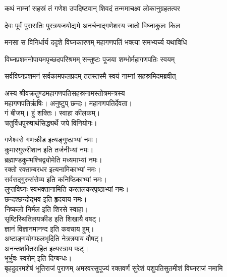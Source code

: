 

\twolineshloka
{कथं नाम्नां सहस्रं तं गणेश उपदिष्टवान्}
{शिवदं तन्ममाचक्ष्व लोकानुग्रहतत्पर}


\twolineshloka
{देवः पूर्वं पुरारातिः पुरत्रयजयोद्यमे}
{अनर्चनाद्गणेशस्य जातो विघ्नाकुलः किल}

\twolineshloka
{मनसा स विनिर्धार्य ददृशे विघ्नकारणम्}
{महागणपतिं भक्त्या समभ्यर्च्य यथाविधि}

\twolineshloka
{विघ्नप्रशमनोपायमपृच्छदपरिश्रमम्}
{सन्तुष्टः पूजया शम्भोर्महागणपतिः स्वयम्}

\twolineshloka
{सर्वविघ्नप्रशमनं सर्वकामफलप्रदम्}
{ततस्तस्मै स्वयं नाम्नां सहस्रमिदमब्रवीत्}

अस्य श्रीवक्रतुण्डमहागणपतिसहस्रनामस्तोत्रमन्त्रस्य\\
महागणपतिर्ऋषिः। अनुष्टुप् छन्दः। महागणपतिर्देवता।\\
गं बीजम्। हुं शक्तिः। स्वाहा कीलकम्।\\
चतुर्विधपुरुषार्थसिद्ध्यर्थे जपे विनियोगः।

{गणेश्वरो गणक्रीड इत्यङ्गुष्ठाभ्यां नमः।}\\
{कुमारगुरुरीशान इति तर्जनीभ्यां नमः।}\\
{ब्रह्माण्डकुम्भश्चिद्व्योमेति मध्यमाभ्यां नमः।}\\
{रक्तो रक्ताम्बरधर इत्यनामिकाभ्यां नमः।}\\
{सर्वसद्गुरुसंसेव्य इति कनिष्ठिकाभ्यां नमः।}\\
{लुप्तविघ्नः स्वभक्तानामिति करतलकरपृष्ठाभ्यां नमः।}\\


छन्दश्छन्दोद्भव इति हृदयाय नमः।\\
निष्कलो निर्मल इति शिरसे स्वाहा।\\
सृष्टिस्थितिलयक्रीड इति शिखायै वषट्।\\
ज्ञानं विज्ञानमानन्द इति कवचाय हुम्।\\
अष्टाङ्गयोगफलभृदिति नेत्रत्रयाय वौषट्।\\
अनन्तशक्तिसहित इत्यस्त्राय फट्।\\
भूर्भुवः स्वरोम् इति दिग्बन्धः।\\


{बृहदुदरमशेषं भूतिराजं पुराणम्}
{अमरवरसुपूज्यं रक्तवर्णं सुरेशं}
{पशुपतिसुतमीशं विघ्नराजं नमामि}

